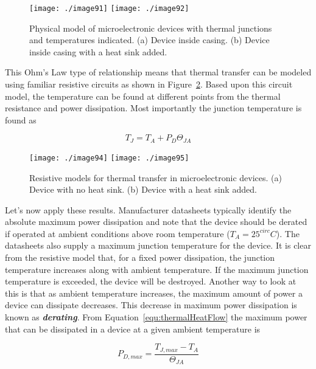 {\begin{figure}[h]
\centering
\texttt{[image: ./image91]}
\texttt{[image: ./image92]}
\caption{Physical model of microelectronic devices with
thermal junctions and temperatures indicated. (a) Device inside casing.
(b) Device inside casing with a heat sink added.}
\label{figure:thermalModelsBJT}
\end{figure}

This Ohm's Law type of relationship means that thermal transfer can be
modeled using familiar resistive circuits as shown in 
Figure~\ref{figure:thermalModelAsCircuit}. Based
upon this circuit model, the temperature can be found at different
points from the thermal resistance and power dissipation. Most
importantly the junction temperature is found as

\begin{equation}
\label{equ:thermalHeatFlow}
T_J = T_A + P_D \Theta_{JA}
\end{equation}

\begin{figure}[h]
\centering
\texttt{[image: ./image94]}
\texttt{[image: ./image95]}
\caption{Resistive models for thermal transfer in
microelectronic devices. (a) Device with no heat sink. (b) Device with a
heat sink added.}
\label{figure:thermalModelAsCircuit}
\end{figure}

Let's now apply these results. Manufacturer datasheets typically
identify the absolute maximum power dissipation and note that the device
should be derated if operated at ambient conditions above room
temperature ($T_A = 25^{circ}C$). The datasheets
also supply a maximum junction temperature for the device. It is clear
from the resistive model that, for a fixed power dissipation, the
junction temperature increases along with ambient temperature. If the
maximum junction temperature is exceeded, the device will be destroyed.
Another way to look at this is that as ambient temperature increases,
the maximum amount of power a device can dissipate decreases. This
decrease in maximum power dissipation is known as
\emph{\textbf{derating}}. From Equation~\ref{equ:thermalHeatFlow}
 the maximum power that can be
dissipated in a device at a given ambient temperature is

\begin{equation}
\label{equ:powerFunctionTemperature}
P_{D,max} = \frac{T_{J,max}  - T_A}{\Theta_{JA}}
\end{equation}

}
